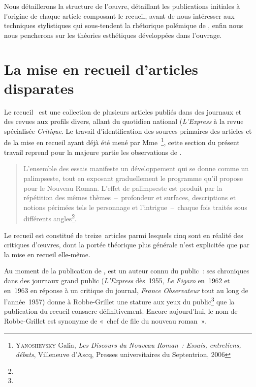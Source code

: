 \documentclass[12pt, a4paper]{article}
\begin{document}
Nous détaillerons la structure de l'œuvre, détaillant les publications initiales à l'origine de chaque article composant le recueil, avant de nous intéresser aux techniques stylistiques qui sous-tendent la rhétorique polémique de \robbe, enfin nous nous pencherons sur les théories esthétiques développées dans l'ouvrage.

\newpage

\section{La mise en recueil d'articles disparates}



Le recueil \punr~est une collection de plusieurs articles publiés dans des journaux et des revues aux profils divers, allant du quotidien national (\textit{L'Express} à la revue spécialisée \textit{Critique}. Le travail d'identification des sources primaires des articles et de la mise en recueil ayant déjà été mené par Mme~\galia\footnote{\textsc{Yanoshevsky} Galia, \textit{Les Discours du Nouveau Roman~: Essais, entretiens, débats}, Villeneuve d'Ascq, Presses universitaires du Septentrion, 2006}, cette section du présent travail reprend pour la majeure partie les observations de \galia.
\begin{quote}
    L’ensemble des essais manifeste un développement qui se donne comme un palimpseste, tout en exposant graduellement le programme qu’il propose pour le Nouveau Roman. L’effet de palimpseste est produit par la répétition des mêmes thèmes~–~profondeur et surfaces, descriptions et notions périmées tels le personnage et l’intrigue~–~chaque fois traités sous différents angles\footnote{}.
\end{quote}
Le recueil est constitué de treize~articles parmi lesquels cinq sont en réalité des critiques d'œuvres, dont la portée théorique plus générale n'est explicitée que par la mise en recueil elle-même.

Au moment de la publication de \punr, \robbe{} est un auteur connu du public~: ses chroniques dans des journaux grand public (\textit{L'Express} dès~1955, \textit{Le Figaro} en~1962 et en~1963 en réponse à un critique du journal, \textit{France Observateur} tout au long de l'année~1957) donne à Robbe-Grillet une stature aux yeux du public\footnote{} que la publication du recueil consacre définitivement. Encore aujourd'hui, le nom de Robbe-Grillet est synonyme de «~chef de file du nouveau roman~».
\end{document}
